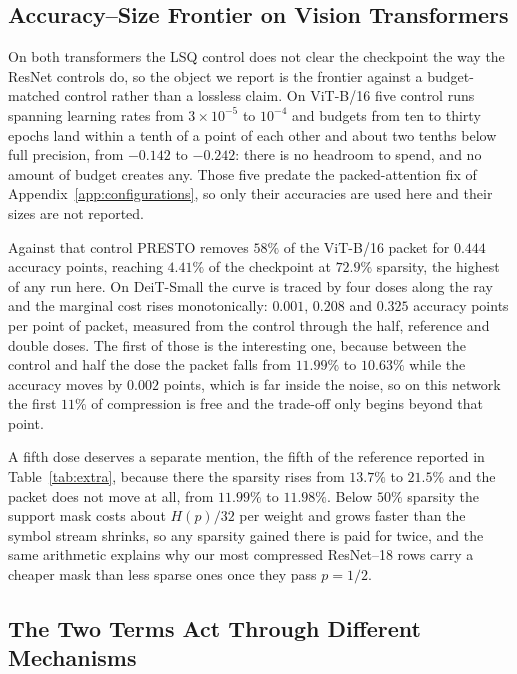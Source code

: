 \documentclass{article}
\begin{document}
\subsection{Accuracy--Size Frontier on Vision Transformers}
\label{sec:transformers}

On both transformers the LSQ control does not clear the checkpoint the way the
ResNet controls do, so the object we report is the frontier against a
budget-matched control rather than a lossless claim. On ViT-B/16 five control
runs spanning learning rates from $3\times10^{-5}$ to $10^{-4}$ and budgets from
ten to thirty epochs land within a tenth of a point of each other and about two
tenths below full precision, from $-0.142$ to $-0.242$: there is no headroom to
spend, and no amount of budget creates any. Those five predate the packed-attention
fix of Appendix~\ref{app:configurations}, so only their accuracies are used
here and their sizes are not reported.

Against that control PRESTO removes $58\%$ of the ViT-B/16 packet for $0.444$
accuracy points, reaching $4.41\%$ of the checkpoint at $72.9\%$ sparsity, the
highest of any run here. On DeiT-Small the curve is traced by four doses along
the ray and the marginal cost rises monotonically: $0.001$, $0.208$ and $0.325$
accuracy points per point of packet, measured from the control through the half,
reference and double doses. The first of those is the interesting one,
because between the control and half the dose the packet falls from $11.99\%$ to
$10.63\%$ while the accuracy moves by $0.002$ points, which is far inside the
noise, so on this network the first $11\%$ of compression is free and the
trade-off only begins beyond that point.

A fifth dose deserves a separate mention, the fifth of the reference reported in
Table~\ref{tab:extra}, because there the sparsity rises from $13.7\%$ to $21.5\%$
and the packet does not move at all, from $11.99\%$ to $11.98\%$.
Below $50\%$ sparsity the support mask costs about $H(p)/32$ per weight and grows
faster than the symbol stream shrinks, so any sparsity gained there is paid for
twice, and the same arithmetic explains why our most compressed ResNet--18 rows
carry a cheaper mask than less sparse ones once they pass $p=1/2$.


\subsection{The Two Terms Act Through Different Mechanisms}
\label{sec:mechanism-ablation}
\end{document}
